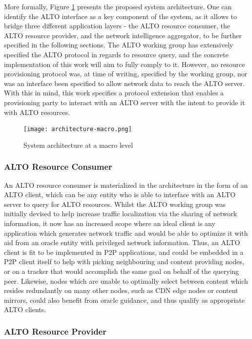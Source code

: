 More formally, Figure \ref{fig:macro-architecture} presents the proposed system architecture. One can identify the ALTO interface as a key component of the system, as it allows to bridge three different application layers - the ALTO resource consumer, the ALTO resource provider, and the network intelligence aggregator, to be further specified in the following sections. The ALTO working group has extensively specified the ALTO protocol in regards to resource query, and the concrete implementation of this work will aim to fully comply to it. However, no resource provisioning protocol was, at time of writing, specified by the working group, nor was an interface been specified to allow network data to reach the ALTO server. With this in mind, this work specifies a protocol extension that enables a provisioning party to interact with an ALTO server with the intent to provide it with ALTO resources.

\begin{figure}[!h]
        \centering
        \texttt{[image: architecture-macro.png]}
        \caption{System architecture at a macro level}
        \label{fig:macro-architecture}
\end{figure}

\subsubsection{ALTO Resource Consumer}

An ALTO resource consumer is materialized in the architecture in the form of an ALTO client, which can be any entity who is able to interface with an ALTO server to query for ALTO resources. Whilst the ALTO working group was initially devised to help increase traffic localization via the sharing of network information, it now has an increased scope where an ideal client is any application which generates network traffic and would be able to optimize it with aid from an oracle entity with privileged network information. Thus, an ALTO client is fit to be implemented in P2P applications, and could be embedded in a P2P client itself to help with picking neighbouring and content providing nodes, or on a tracker that would accomplish the same goal on behalf of the querying peer. Likewise, nodes which are unable to optimally select between content which resides redundantly on many other nodes, such as CDN edge nodes or content mirrors, could also benefit from oracle guidance, and thus qualify as appropriate ALTO clients.

\subsubsection{ALTO Resource Provider}

